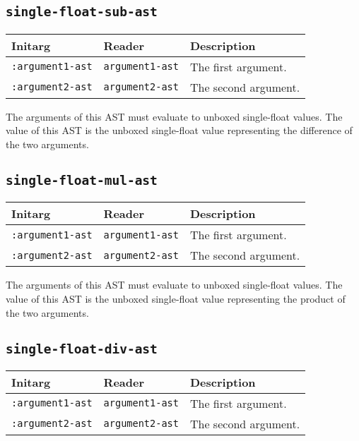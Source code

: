 \subsection{\texttt{single-float-sub-ast}}
\label{sec-ast-single-float-sub}

\begin{tabular}{|l|l|l|}
\hline
Initarg & Reader & Description\\
\hline\hline
\texttt{:argument1-ast} & \texttt{argument1-ast} & The first argument.\\
\hline
\texttt{:argument2-ast} & \texttt{argument2-ast} & The second argument.\\
\hline
\end{tabular}

The arguments of this AST must evaluate to unboxed single-float
values.  The value of this AST is the unboxed single-float value
representing the difference of the two arguments.

\subsection{\texttt{single-float-mul-ast}}
\label{sec-ast-single-float-mul}

\begin{tabular}{|l|l|l|}
\hline
Initarg & Reader & Description\\
\hline\hline
\texttt{:argument1-ast} & \texttt{argument1-ast} & The first argument.\\
\hline
\texttt{:argument2-ast} & \texttt{argument2-ast} & The second argument.\\
\hline
\end{tabular}

The arguments of this AST must evaluate to unboxed single-float
values.  The value of this AST is the unboxed single-float value
representing the product of the two arguments.

\subsection{\texttt{single-float-div-ast}}
\label{sec-ast-single-float-div}

\begin{tabular}{|l|l|l|}
\hline
Initarg & Reader & Description\\
\hline\hline
\texttt{:argument1-ast} & \texttt{argument1-ast} & The first argument.\\
\hline
\texttt{:argument2-ast} & \texttt{argument2-ast} & The second argument.\\
\hline
\end{tabular}


